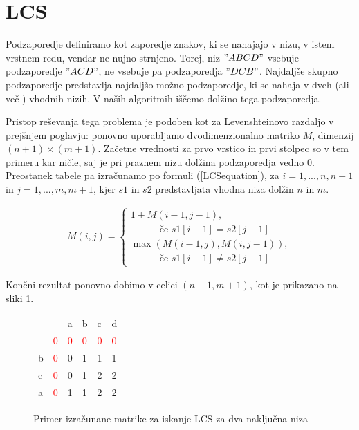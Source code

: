 \documentclass[a4paper,12pt,openright]{book}
\begin{document}
\section{LCS}

Podzaporedje definiramo kot zaporedje znakov, ki se nahajajo v nizu, v istem vrstnem redu, vendar ne nujno strnjeno. Torej, niz $"ABCD"$ vsebuje podzaporedje $"ACD"$, ne vsebuje pa podzaporedja $"DCB"$. Najdaljše skupno podzaporedje predstavlja najdaljšo možno podzaporedje, ki se nahaja v dveh (ali več \cite{LCSmultipleSequences}) vhodnih nizih. V naših algoritmih iščemo dolžino tega podzaporedja. 

Pristop reševanja tega problema je podoben kot za Levenshteinovo razdaljo v prejšnjem poglavju: ponovno uporabljamo dvodimenzionalno matriko $M$, dimenzij $(n+1) \times (m+1)$. Začetne vrednosti za prvo vrstico in prvi stolpec so v tem primeru kar ničle, saj je pri praznem nizu dolžina podzaporedja vedno 0. Preostanek tabele pa izračunamo po formuli (\ref{LCSequation}), za $i=1,...,n,n+1$ in $j=1,...,m,m+1$, kjer $s1$ in $s2$ predstavljata vhodna niza dolžin $n$ in $m$. 

\begin{equation}
\label{LCSequation}
\begin{aligned}
M(i, j) = 
\begin{cases}
     1 + M(i-1, j-1) ,      \\ \quad \quad \quad\text{če } s1[i-1]=s2[j-1]\\
     \max(M(i-1, j), M(i, j-1)) , \\ \quad \quad \quad \text{če } s1[i-1] \neq s2[j-1]
  \end{cases}
\end{aligned}
\end{equation}

\bigskip \bigskip

Končni rezultat ponovno dobimo v celici $(n+1, m+1)$, kot je prikazano na sliki \ref{LCSexample}. 

\begin{figure}[htb]
\centering
\begin{tabular}{|l|l|l|l|l|l|}
\cline{3-6}
  \multicolumn{2}{c|}{}  & a & b & c & d\\ \cline{2-6}
 \multicolumn{1}{c|}{} & \textcolor{red}{0} & \textcolor{red}{0} & \textcolor{red}{0} & \textcolor{red}{0} & \textcolor{red}{0}\\ \hline
b  & \textcolor{red}{0} & 0 & \cellcolor{blue!15}1 & 1 & 1\\ \hline
c  & \textcolor{red}{0} & 0 & 1 & \cellcolor{blue!15}2 & \cellcolor{blue!15}2\\ \hline
a  & \textcolor{red}{0} & 1 & 1 & 2 & \cellcolor{blue!25}2 \\ \hline
\end{tabular}
\caption{Primer izračunane matrike za iskanje LCS za dva naključna niza}
\label{LCSexample}
\end{figure}
\end{document}
